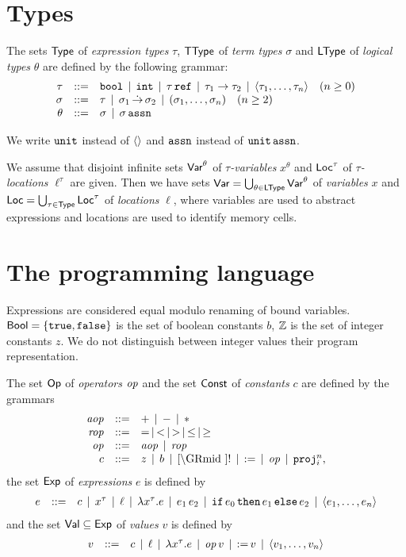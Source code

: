 \documentclass[12pt,a4paper]{article}
\newcommand{\aop}{\nstyle{aop}}
\newcommand{\rop}{\nstyle{rop}}
\begin{document}
\section{Types}

\begin{definition}
  The sets $\mathsf{Type}$ of {\em expression types} $\tau$, $\mathsf{TType}$ of {\em term types} $\sigma$ and
  $\mathsf{LType}$ of {\em logical types} $\theta$ are defined by the following grammar:
  \[\GRbeg
  \tau \GRis \tbool \GRmid \tint \GRmid \tref{\tau}
  \GRmid \tarrow{\tau_1}{\tau_2} \GRmid \tuple{\tau_1,\ldots,\tau_n} \quad (n \ge 0)
  \\
  \sigma \GRis \tau \GRmid \ttarrow{\sigma_1}{\sigma_2} \GRmid \ttuple{\sigma_1,\ldots,\sigma_n} \quad (n \ge 2)
  \\
  \theta \GRis \sigma \GRmid \tassn[\sigma]
  \GRend\]
\end{definition}

We write $\mathtt{unit}$ instead of $\langle  \rangle$ and $\tassn$ instead of $\tassn[\tunit]$.

We assume that disjoint infinite sets $\mathsf{Var}^\theta$ of {\em $\tau$-variables} $x^\theta$ and $\mathsf{Loc}^\tau$ of
{\em $\tau$-locations} $\ell^\tau$ are given. Then we have sets $\mathsf{Var} = \bigcup_{\theta\in\mathsf{LType}}\mathsf{Var}^\theta$ of
{\em variables} $x$ and $\mathsf{Loc} = \bigcup_{\tau\in\mathsf{Type}}\mathsf{Loc}^\tau$ of {\em locations} $\ell$, where variables are
used to abstract expressions and locations are used to identify memory cells.


\section{The programming language}

Expressions are considered equal modulo renaming of bound variables. $\mathsf{Bool}=\{\mathtt{true},\mathtt{false}\}$ is
the set of boolean constants $b$, $\mathbb Z$ is the set of integer constants $z$. We do not distinguish
between integer values their program representation.

\begin{definition}[Expressions]
  The set $\mathsf{Op}$ of {\em operators} $\mathit{op}$ and the set $\mathsf{Const}$ of {\em constants} $c$ are defined by
  the grammars
  \[\GRbeg
  \aop \GRis + \GRmid - \GRmid * \\
  \rop \GRis = \GRmid < \GRmid > \GRmid \le \GRmid \ge \\
  \op \GRis \aop \GRmid \rop \\
  c \GRis z \GRmid b \GRmid \cref \GRmid ! \GRmid \assign
  \GRmid \op
  \GRmid \proj{n}{i},
  \GRend\]
  the set $\mathsf{Exp}$ of {\em expressions} $e$ is defined by
  \[\begin{array}{rrlll}
  e & ::= & c \,\mid\, x^\tau \,\mid\, \ell \,\mid\, \lambda x^\tau.e \,\mid\, e_1\,e_2
  \,\mid\, \mathtt{if}\,e_0\,\mathtt{then}\,e_1\,\mathtt{else}\,e_2 \,\mid\, \langle e_1,\ldots,e_n \rangle
  \end{array}\]
  and the set $\mathsf{Val} \subseteq \mathsf{Exp}$ of {\em values} $v$ is defined by
  \[\begin{array}{rrlll}
  v & ::= & c \,\mid\, \ell \,\mid\, \lambda x^\tau.e \,\mid\, \mathit{op}\,v \,\mid\, \mathtt{:=}\,v \,\mid\, \langle v_1,\ldots,v_n \rangle
  \end{array}\]
\end{definition}
\end{document}
